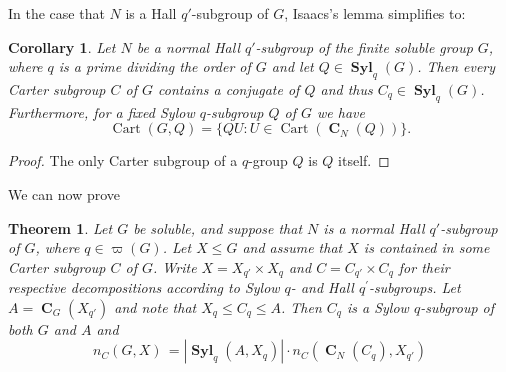 \documentclass[10pt,a4paper]{amsart}
\numberwithin{equation}{section}
\DeclareMathOperator{\cart}{Cart}
\DeclareMathOperator{\cent}{\mathbf{C}}
\DeclareMathOperator{\syl}{\mathbf{Syl}}
\renewcommand{\leq}{\leqslant}
\newtheorem{prevtheorem}{Theorem}
\newtheorem{corollary}[theorem]{Corollary}
\begin{document}
In the case that $N$ is a Hall $q'$-subgroup of $G$, Isaacs's lemma  simplifies to: 
\begin{corollary}\label{Cor:IsaacsOnePrime}
Let $N$ be a normal Hall $q'$-subgroup of the finite soluble group $G$,
where $q $ is a prime dividing the order of $G$  
and let $Q \in \syl_{q}(G)$. 
Then every Carter subgroup $C$ of $G$ contains a conjugate of $Q$ and thus $C_q  \in \syl_q(G)$.
Furthermore, for a  fixed  Sylow $q$-subgroup $Q$  of $G$ 
we have 
\[
\cart(G, Q) = \{ QU : U \in \cart(\cent_N(Q))\}.
\]

\end{corollary}
\begin{proof}
The only Carter subgroup of a $q$-group $Q$  is $Q$ itself. 
\end{proof}

We can now prove 

\begin{prevtheorem}\label{Thm:EOnePrime}
Let $G$ be soluble, and suppose that $N$
	is a normal Hall $q'$-subgroup of $G$, where $q \in \varpi(G)$. 
	Let $X \leq G$ and assume that
	$X$ is contained in some Carter subgroup $C$ of $G$. 
	Write $X = X_{q'}  \times X_{q}$ and $C = C_{q'} \times C_{q}$ 
	for their respective decompositions according to Sylow $q$- and Hall $q^{\prime}$-subgroups.
 Let $A = \cent_G(X_{q'})$  and note that  $X_{q} \leq C_{q} \leq A$. Then $C_q$ is a Sylow $q$-subgroup of both  $G$ and  $A$ and  
 \begin{equation}
 n_C(G,X) \, =  |\syl_q(A, X_q)| \cdot  n_C(\cent_N(C_{q}), X_{q'})
	\end{equation}
\end{prevtheorem}
\end{document}
